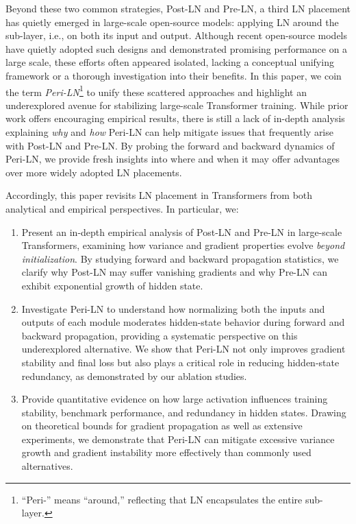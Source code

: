Beyond these two common strategies, Post-LN and Pre-LN, a third LN placement has quietly emerged in large-scale open-source models: applying LN around the sub-layer, i.e., on both its input and output. 
Although recent open-source models \citep{gemma2, olmo2} have quietly adopted such designs and demonstrated promising performance on a large scale, these efforts often appeared isolated, lacking a conceptual unifying framework or a thorough investigation into their benefits. In this paper, we coin the term \emph{Peri-LN}\footnote{``Peri-'' means ``around,'' reflecting that LN encapsulates the entire sub-layer.} to unify these scattered approaches and highlight an underexplored avenue for stabilizing large-scale Transformer training. While prior work offers encouraging empirical results, there is still a lack of in-depth analysis explaining \emph{why} and \emph{how} Peri-LN can help mitigate issues that frequently arise with Post-LN and Pre-LN. By probing the forward and backward dynamics of Peri-LN, we provide fresh insights into where and when it may offer advantages over more widely adopted LN placements.

Accordingly, this paper revisits LN placement in Transformers from both analytical and empirical perspectives. In particular, we:

\begin{enumerate}
    \item Present an in-depth empirical analysis of Post-LN and Pre-LN in large-scale Transformers, examining how variance and gradient properties evolve \emph{beyond initialization}. By studying forward and backward propagation statistics, we clarify why Post-LN may suffer vanishing gradients and why Pre-LN can exhibit exponential growth of hidden state.
    \item Investigate Peri-LN to understand how normalizing both the inputs and outputs of each module moderates hidden-state behavior during forward and backward propagation, providing a systematic perspective on this underexplored alternative. We show that Peri-LN not only improves gradient stability and final loss but also plays a critical role in reducing hidden-state redundancy, as demonstrated by our ablation studies. 
    \item Provide quantitative evidence on how large activation influences training stability, benchmark performance, and redundancy in hidden states. Drawing on theoretical bounds for gradient propagation as well as extensive experiments, we demonstrate that Peri-LN can mitigate excessive variance growth and gradient instability more effectively than commonly used alternatives. 
\end{enumerate}

